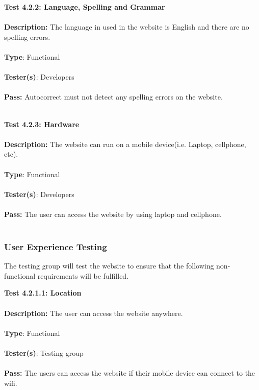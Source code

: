 \documentclass[12pt]{article}
\begin{document}
\begin{tcolorbox}
\textbf{Test 4.2.2: Language, Spelling and Grammar} \\ \\
\textbf{Description:} The language in used in the website is English and there are no spelling errors. \\ \\
\textbf{Type}: Functional \\ \\
\textbf{Tester(s)}: Developers \\ \\
\textbf{Pass:} Autocorrect must not detect any spelling errors on the website. \\ \\
\end{tcolorbox}

\begin{tcolorbox}
\textbf{Test 4.2.3: Hardware} \\ \\
\textbf{Description:} The website can run on a mobile device(i.e. Laptop, cellphone, etc). \\ \\
\textbf{Type}: Functional \\ \\
\textbf{Tester(s)}: Developers \\ \\
\textbf{Pass:} The user can access the website by using laptop and cellphone. \\ \\
\end{tcolorbox}

\subsubsection{User Experience Testing}
The testing group will test the website to ensure that the following non-functional requirements will be fulfilled.

\begin{tcolorbox}
\textbf{Test 4.2.1.1: Location} \\ \\
\textbf{Description:} The user can access the website anywhere. \\ \\
\textbf{Type}: Functional  \\ \\
\textbf{Tester(s)}: Testing group \\ \\
\textbf{Pass:} The users can access the website if their mobile device can connect to the wifi. \\ \\
\end{tcolorbox}
\end{document}
